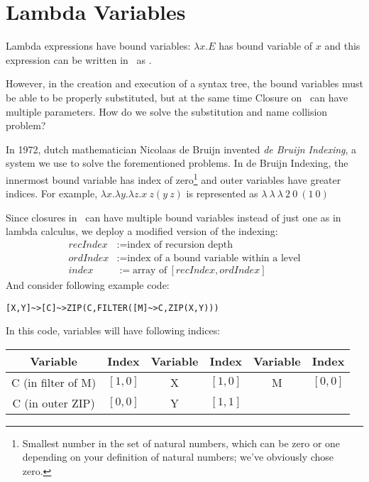 \section{Lambda Variables}

Lambda expressions have bound variables: $\lambda x . E$ has bound variable of $x$ and this expression can be written in \tbas\ as .

However, in the creation and execution of a syntax tree, the bound variables must be able to be properly substituted, but at the same time Closure on \tbas\ can have multiple parameters. How do we solve the substitution and name collision problem?

In 1972, dutch mathematician Nicolaas de Bruijn invented \emph{de Bruijn Indexing}, a system we use to solve the forementioned problems. In de Bruijn Indexing, the innermost bound variable has index of zero\footnote{Smallest number in the set of natural numbers, which can be zero or one depending on your definition of natural numbers; we've obviously chose zero.} and outer variables have greater indices. For example, $\lambda x . \lambda y . \lambda z . x\ z (y\ z)$ is represented as $\lambda\ \lambda\ \lambda\ 2\ 0\ (1\ 0)$

Since closures in \tbas\ can have multiple bound variables instead of just one as in lambda calculus, we deploy a modified version of the indexing:
\begin{align*}
recIndex &:= \text{index of recursion depth}\\
ordIndex &:= \text{index of a bound variable within a level}\\
index &:= \text{array of}\ [recIndex, ordIndex]
\end{align*}
And consider following example code:
\begin{lstlisting}
[X,Y]~>[C]~>ZIP(C,FILTER([M]~>C,ZIP(X,Y)))
\end{lstlisting}

In this code, variables will have following indices:

\begin{tabulary}{\textwidth}{cC|cC|cC}
Variable & Index & Variable & Index & Variable & Index \\
\hline
C {\condensedfont (in filter of M)} & $[1,0]$ & X & $[1,0]$ & M & $[0,0]$ \\
C {\condensedfont (in outer ZIP)} & $[0,0]$ & Y & $[1,1]$ & \ & \ \\
\end{tabulary}

